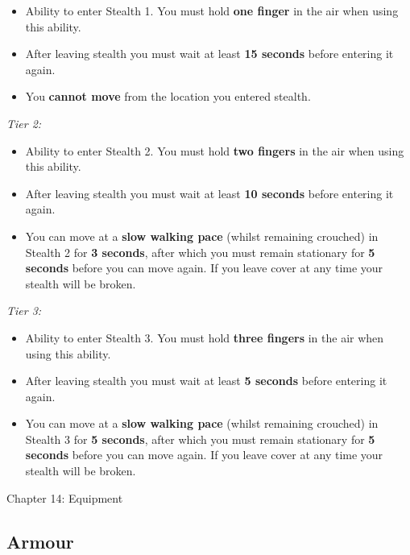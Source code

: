 \documentclass{scrbook}
\begin{document}
\begin{itemize}
\item Ability to enter Stealth 1. You must hold \textbf{one finger} in the air when using this ability.

\item After leaving stealth you must wait at least \textbf{15 seconds} before entering it again.

\item You \textbf{cannot move} from the location you entered stealth.

\end{itemize}
\textit{Tier 2:}

\begin{itemize}
\item Ability to enter Stealth 2. You must hold \textbf{two fingers} in the air when using this ability.

\item After leaving stealth you must wait at least \textbf{10 seconds} before entering it again.

\item You can move at a \textbf{slow walking pace} (whilst remaining crouched) in Stealth 2 for \textbf{3 seconds}, after which you must remain stationary for \textbf{5 seconds} before you can move again. If you leave cover at any time your stealth will be broken.

\end{itemize}
\textit{Tier 3:}

\begin{itemize}
\item Ability to enter Stealth 3. You must hold \textbf{three fingers} in the air when using this ability.

\item After leaving stealth you must wait at least \textbf{5 seconds} before entering it again.

\item You can move at a \textbf{slow walking pace} (whilst remaining crouched) in Stealth 3 for \textbf{5 seconds}, after which you must remain stationary for \textbf{5 seconds} before you can move again. If you leave cover at any time your stealth will be broken.

\end{itemize}
Chapter 14: Equipment

\subsection{Armour}
\end{document}
